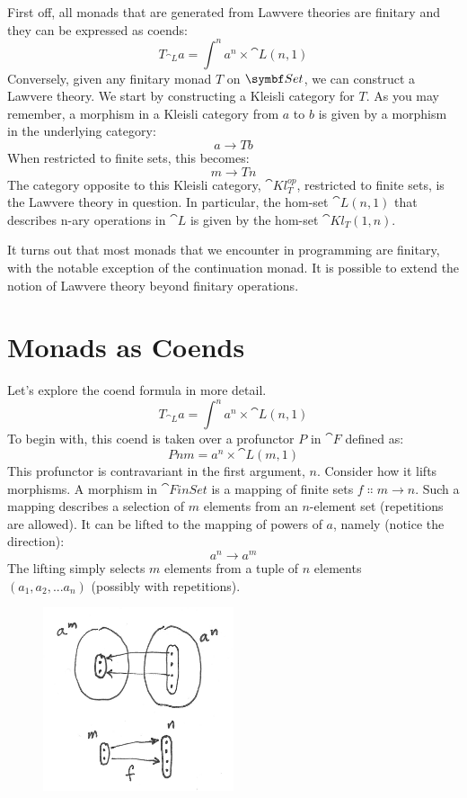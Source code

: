 First off, all monads that are generated from Lawvere theories are
finitary and they can be expressed as coends:
\[T_{\cat{L}} a = \int^n a^n \times \cat{L}(n, 1)\]
Conversely, given any finitary monad $T$ on $\Set$, we can
construct a Lawvere theory. We start by constructing a Kleisli category
for $T$. As you may remember, a morphism in a Kleisli category
from $a$ to $b$ is given by a morphism in the underlying
category:
\[a \to T b\]
When restricted to finite sets, this becomes:
\[m \to T n\]
The category opposite to this Kleisli category,
$\cat{Kl}^{op}_{T}$, restricted to finite
sets, is the Lawvere theory in question. In particular, the hom-set
$\cat{L}(n, 1)$ that describes n-ary operations in $\cat{L}$ is given
by the hom-set $\cat{Kl}_{T}(1, n)$.

It turns out that most monads that we encounter in programming are
finitary, with the notable exception of the continuation monad. It is
possible to extend the notion of Lawvere theory beyond finitary
operations.

\section{Monads as Coends}

Let's explore the coend formula in more detail.
\[T_{\cat{L}} a = \int^n a^n \times \cat{L}(n, 1)\]
To begin with, this coend is taken over a profunctor $P$ in
$\cat{F}$ defined as:
\[P n m = a^n \times \cat{L}(m, 1)\]
This profunctor is contravariant in the first argument, $n$.
Consider how it lifts morphisms. A morphism in $\cat{FinSet}$ is a
mapping of finite sets $f \Colon m \to n$. Such a
mapping describes a selection of $m$ elements from an $n$-element set
(repetitions are allowed). It can be lifted to the mapping of powers of
$a$, namely (notice the direction):
\[a^n \to a^m\]
The lifting simply selects $m$ elements from a tuple of $n$ elements\\
$(a_1, a_2,...a_n)$ (possibly with repetitions).

\begin{figure}[H]
  \centering
  \includegraphics[width=0.5\textwidth]{images/liftpower.png}
\end{figure}

